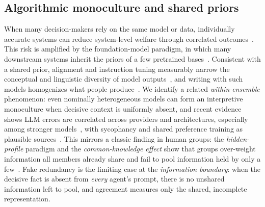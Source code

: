 \documentclass[acmsmall,screen,nonacm]{acmart}
\begin{document}
\subsection{Algorithmic monoculture and shared priors}
When many decision-makers rely on the same model or data, individually accurate systems can reduce
system-level welfare through correlated outcomes~\cite{kleinberg2021monoculture}. This risk is amplified by
the foundation-model paradigm, in which many downstream systems inherit the priors of a few pretrained
bases~\cite{bommasani2021foundation}. Consistent with a shared prior, alignment and instruction tuning
measurably narrow the conceptual and linguistic diversity of model outputs~\cite{murthy2025alignment,
guo2025diversity}, and writing with such models homogenizes what people produce~\cite{padmakumar2024writing}.
We identify a related \emph{within-ensemble} phenomenon: even nominally heterogeneous models can form an
interpretive monoculture when decisive context is uniformly absent, and recent evidence shows LLM errors are
correlated across providers and architectures, especially among stronger models~\cite{kim2025correlated},
with sycophancy and shared preference training as plausible sources~\cite{perez2022,sharma2024}.
This mirrors a classic finding in human groups: the \emph{hidden-profile} paradigm and the
\emph{common-knowledge effect} show that groups over-weight information all members already share and fail
to pool information held by only a few~\cite{stasser1985hidden,gigone1993common}. Fake redundancy is the
limiting case at the \emph{information boundary}: when the decisive fact is absent from \emph{every} agent's
prompt, there is no unshared information left to pool, and agreement measures only the shared, incomplete
representation.
\end{document}
